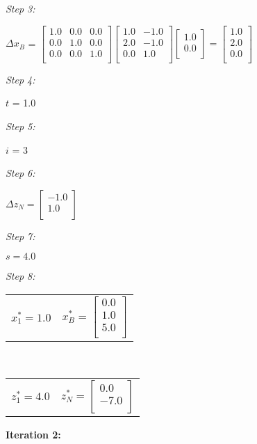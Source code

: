 \documentclass{article}
\begin{document}
\textit{Step 3:}\\
\begin{center}$\Delta x_B$ = $\left[\begin{array}{ccc}1.0 & 0.0 & 0.0\\ 0.0 & 1.0 & 0.0\\ 0.0 & 0.0 & 1.0\\ \end{array}\right]\left[\begin{array}{cc}1.0 & -1.0\\ 2.0 & -1.0\\ 0.0 & 1.0\\ \end{array}\right]\left[\begin{array}{c}1.0\\ 0.0\\ \end{array}\right] = \left[\begin{array}{c}1.0\\ 2.0\\ 0.0\\ \end{array}\right]$\end{center}
\textit{Step 4:}\\
\begin{center}
$t$ = 1.0
\end{center}
\textit{Step 5:}\\
\begin{center}
$i$ = 3
\end{center}
\textit{Step 6:}\\
\begin{center}$\Delta z_N = \left[\begin{array}{c}-1.0\\ 1.0\\ \end{array}\right]$\end{center}
\textit{Step 7:}\\
\begin{center}$s = 4.0$\end{center}
\textit{Step 8:}\\
\begin{center}
\begin{tabular}{cc}$x_1^* = 1.0$ & $x_B^* = \left[\begin{array}{c}0.0\\ 1.0\\ 5.0\\ \end{array}\right]$\end{tabular}
\\
\begin{tabular}{cc}$z_1^* = 4.0$ & $z_N^* = \left[\begin{array}{c}0.0\\ -7.0\\ \end{array}\right]$\end{tabular}
\end{center}
\textbf{Iteration 2: }
\end{document}
